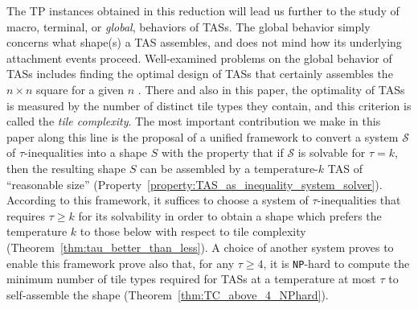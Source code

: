 \documentclass{article}
\theoremstyle{remark}
\theoremstyle{definition}
\newcommand{\NP}{{\tt NP}}
\begin{document}
The TP instances obtained in this reduction will lead us further to the study of macro, terminal, or {\it global}, behaviors of TASs. 
The global behavior simply concerns what shape(s) a TAS assembles, and does not mind how its underlying attachment events proceed. 
Well-examined problems on the global behavior of TASs includes finding the optimal design of TASs that certainly assembles the $n \times n$ square for a given $n$ \cite{AdChGoHu2001, AdChGoHuKeEsRo2002, RothemundWinfree2000}. 
There and also in this paper, the optimality of TASs is measured by the number of distinct tile types they contain, and this criterion is called the {\it tile complexity}.  
The most important contribution we make in this paper along this line is the proposal of a unified framework to convert a system $\mathcal{S}$ of $\tau$-inequalities into a shape $S$ with the property that if $\mathcal{S}$ is solvable for $\tau = k$, then the resulting shape $S$ can be assembled by a temperature-$k$ TAS of ``reasonable size'' (Property~\ref{property:TAS_as_inequality_system_solver}). 
According to this framework, it suffices to choose a system of $\tau$-inequalities that requires $\tau \ge k$ for its solvability in order to obtain a shape which prefers the temperature $k$ to those below with respect to tile complexity (Theorem~\ref{thm:tau_better_than_less}). 
A choice of another system proves to enable this framework prove also that, for any $\tau \ge 4$, it is \NP-hard to compute the minimum number of tile types required for TASs at a temperature at most $\tau$ to self-assemble the shape (Theorem~\ref{thm:TC_above_4_NPhard}). 

\end{document}
